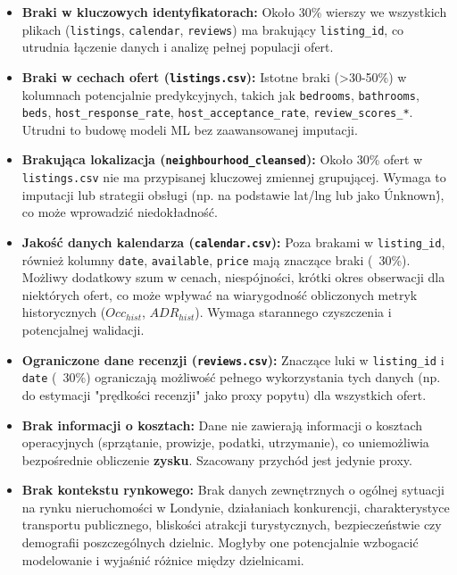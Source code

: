 \documentclass[a4paper,11pt]{article}
\begin{document}
\begin{tcolorbox}[colback=red!5!white,colframe=red!50!black,title=Główne ograniczenia i wyzwania jakościowe]
\begin{itemize}[label=$\times$,leftmargin=*,itemsep=2pt]
  \item \textbf{Braki w kluczowych identyfikatorach:} Około 30\% wierszy we wszystkich plikach (\texttt{listings}, \texttt{calendar}, \texttt{reviews}) ma brakujący \texttt{listing\_id}, co utrudnia łączenie danych i analizę pełnej populacji ofert.
  \item \textbf{Braki w cechach ofert (\texttt{listings.csv}):} Istotne braki (>30-50\%) w kolumnach potencjalnie predykcyjnych, takich jak \texttt{bedrooms}, \texttt{bathrooms}, \texttt{beds}, \texttt{host\_response\_rate}, \texttt{host\_acceptance\_rate}, \texttt{review\_scores\_*}. Utrudni to budowę modeli ML bez zaawansowanej imputacji.
  \item \textbf{Brakująca lokalizacja (\texttt{neighbourhood\_cleansed}):} Około 30\% ofert w \texttt{listings.csv} nie ma przypisanej kluczowej zmiennej grupującej. Wymaga to imputacji lub strategii obsługi (np. na podstawie lat/lng lub jako \'Unknown\'), co może wprowadzić niedokładność.
  \item \textbf{Jakość danych kalendarza (\texttt{calendar.csv}):} Poza brakami w \texttt{listing\_id}, również kolumny \texttt{date}, \texttt{available}, \texttt{price} mają znaczące braki (~30\%). Możliwy dodatkowy szum w cenach, niespójności, krótki okres obserwacji dla niektórych ofert, co może wpływać na wiarygodność obliczonych metryk historycznych ($Occ_{hist}$, $ADR_{hist}$). Wymaga starannego czyszczenia i potencjalnej walidacji.
  \item \textbf{Ograniczone dane recenzji (\texttt{reviews.csv}):} Znaczące luki w \texttt{listing\_id} i \texttt{date} (~30\%) ograniczają możliwość pełnego wykorzystania tych danych (np. do estymacji "prędkości recenzji" jako proxy popytu) dla wszystkich ofert.
  \item \textbf{Brak informacji o kosztach:} Dane nie zawierają informacji o kosztach operacyjnych (sprzątanie, prowizje, podatki, utrzymanie), co uniemożliwia bezpośrednie obliczenie \textbf{zysku}. Szacowany przychód jest jedynie proxy.
  \item \textbf{Brak kontekstu rynkowego:} Brak danych zewnętrznych o ogólnej sytuacji na rynku nieruchomości w Londynie, działaniach konkurencji, charakterystyce transportu publicznego, bliskości atrakcji turystycznych, bezpieczeństwie czy demografii poszczególnych dzielnic. Mogłyby one potencjalnie wzbogacić modelowanie i wyjaśnić różnice między dzielnicami.
\end{itemize}
\end{tcolorbox}
\end{document}
